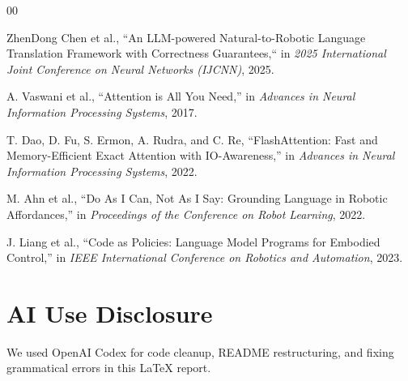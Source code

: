 \documentclass[conference]{IEEEtran}
\begin{document}
\begin{thebibliography}{00}

ZhenDong Chen et al., ``An LLM-powered Natural-to-Robotic Language Translation Framework with Correctness Guarantees,`` in \textit{2025 International Joint Conference on Neural Networks (IJCNN)}, 2025.

A. Vaswani et al., ``Attention is All You Need,'' in \textit{Advances in Neural Information Processing Systems}, 2017.

T. Dao, D. Fu, S. Ermon, A. Rudra, and C. Re, ``FlashAttention: Fast and Memory-Efficient Exact Attention with IO-Awareness,'' in \textit{Advances in Neural Information Processing Systems}, 2022.

M. Ahn et al., ``Do As I Can, Not As I Say: Grounding Language in Robotic Affordances,'' in \textit{Proceedings of the Conference on Robot Learning}, 2022.

J. Liang et al., ``Code as Policies: Language Model Programs for Embodied Control,'' in \textit{IEEE International Conference on Robotics and Automation}, 2023.


\end{thebibliography}

\appendices
\section{AI Use Disclosure}

We used OpenAI Codex for code cleanup, README restructuring, and fixing grammatical errors in this LaTeX report. 
\end{document}
